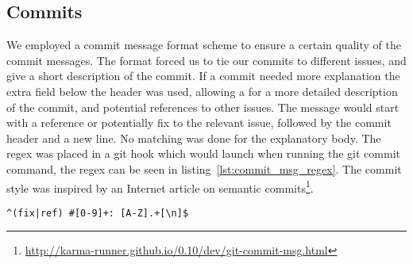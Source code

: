 \subsection{Commits}
We employed a commit message format scheme to ensure a certain quality of the commit messages.
The format forced us to tie our commits to different issues, and give a short description of the commit.
If a commit needed more explanation the extra field below the header was used,
allowing a for a more detailed description of the commit, and potential references to other issues.
The message would start with a reference or potentially fix to the relevant issue,
followed by the commit header and a new line.
No matching was done for the explanatory body.
The regex was placed in a git hook which would launch when running the git commit command, the regex can be seen in listing~\ref{lst:commit_msg_regex}.
The commit style was inspired by an Internet article on semantic commits\footnote{\url{http://karma-runner.github.io/0.10/dev/git-commit-msg.html}}.

\begin{lstlisting}[xleftmargin=18.0ex, caption=Commit message regex, captionpos=b, label=lst:commit_msg_regex]
^(fix|ref) #[0-9]+: [A-Z].+[\n]$
\end{lstlisting}

